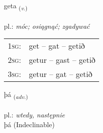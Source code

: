 \documentclass[frontgrid, backgrid]{flacards}\usepackage[]{graphicx}\usepackage[]{xcolor}
\begin{document}
\renewcommand{\blhead}{\vskip5pt {\small\bfseries\footnotesize Sagnorð | Verb }}
\renewcommand{\bcfoot}{\vskip5pt \hspace{2pt}{\small\bfseries\footnotesize 1K}}


{geta \small{\textsubscript{(\textit{v.})}} \\[1ex] %
\textphonetic{[cɛːta]} \\
pl.: \emph{móc; osiągnąć; zgadywać} \\  [2ex]
\renewcommand*{\arraystretch}{0.8}
\begin{tabular}{p{1cm}l}
\textsc{1sg}: & get -- gat -- getið \\ 
\textsc{2sg}: & getur -- gast -- getið \\ 
\textsc{3sg}: & getur -- gat -- getið \\ 
\end{tabular}
}


\renewcommand{\flhead}{\vskip5pt \fboxsep=0pt {\small\bfseries\footnotesize Atviksorð | Adverb}}
\renewcommand{\fcfoot}{\vskip5pt \fboxsep=0pt \hspace{2pt}{\small\bfseries\footnotesize 1K}}

\renewcommand{\blhead}{\vskip5pt {\small\bfseries\footnotesize Atviksorð | Adverb }}
\renewcommand{\bcfoot}{\vskip5pt \hspace{2pt}{\small\bfseries\footnotesize 1K}}


{þá \small{\textsubscript{(\textit{adv.})}} \\[1ex]
\textphonetic{[θauː]} \\
pl.: \emph{wtedy, następnie} \\  [2ex]
þá (Indeclinable)}

\renewcommand{\flhead}{\vskip5pt \fboxsep=0pt {\small\bfseries\footnotesize Sagnorð | Verb}}
\renewcommand{\fcfoot}{\vskip5pt \fboxsep=0pt \hspace{2pt}{\small\bfseries\footnotesize 1K}}

\renewcommand{\blhead}{\vskip5pt {\small\bfseries\footnotesize Sagnorð | Verb }}
\renewcommand{\bcfoot}{\vskip5pt \hspace{2pt}{\small\bfseries\footnotesize 1K}}
\end{document}
